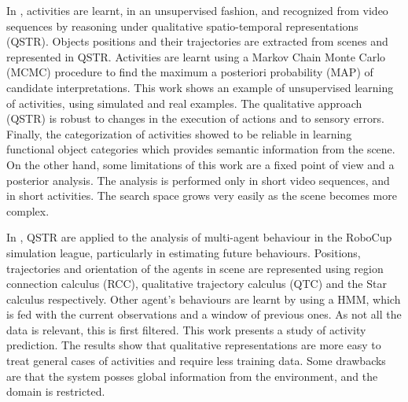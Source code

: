 In \citep{Sridhar10_PhD_UnsupervisedLearningEvent}, activities are learnt, in an unsupervised fashion, and recognized from video sequences by reasoning under qualitative spatio-temporal representations (QSTR). 
Objects positions and their trajectories are extracted from scenes and represented in QSTR.
Activities are learnt using a Markov Chain Monte Carlo (MCMC) procedure to find the maximum a posteriori probability (MAP) of candidate interpretations.
This work shows an example of unsupervised learning of activities, using simulated and real examples.
The qualitative approach (QSTR) is robust to changes in the execution of actions and to sensory errors.
Finally, the categorization of activities showed to be reliable in learning functional object categories which provides semantic information from the scene.
On the other hand, some limitations of this work are a fixed point of view and a posterior analysis.
The analysis is performed only in short video sequences, and in short activities.
The search space grows very easily as the scene becomes more complex.

In \citep{Young13_PredcitingSituatedBehaviour,Young14_EffectsTraining}, QSTR are applied to the analysis of multi-agent behaviour in the RoboCup simulation league, particularly in estimating future behaviours. 
Positions, trajectories and orientation of the agents in scene are represented using region connection calculus (RCC), qualitative trajectory calculus (QTC) and the Star calculus respectively. 
Other agent's behaviours are learnt by using a HMM, which is fed with the current observations and a window of previous ones. 
As not all the data is relevant, this is first filtered. 
This work presents a study of activity prediction.
The results show that qualitative representations are more easy to treat general cases of activities and require less training data. 
Some drawbacks are that the system posses global information from the environment, and the domain is restricted.




